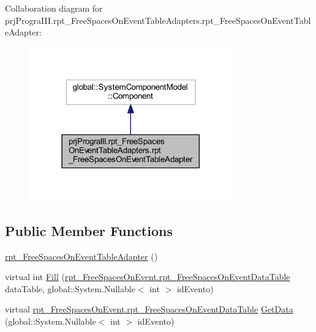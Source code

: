 Collaboration diagram for prj\+Progra\+I\+I\+I.\+rpt\+\_\+\+Free\+Spaces\+On\+Event\+Table\+Adapters.\+rpt\+\_\+\+Free\+Spaces\+On\+Event\+Table\+Adapter\+:
\nopagebreak
\begin{figure}[H]
\begin{center}
\leavevmode
\includegraphics[width=248pt]{classprj_progra_i_i_i_1_1rpt___free_spaces_on_event_table_adapters_1_1rpt___free_spaces_on_event_table_adapter__coll__graph}
\end{center}
\end{figure}
\subsection*{Public Member Functions}
\begin{DoxyCompactItemize}
\item 
\hyperlink{classprj_progra_i_i_i_1_1rpt___free_spaces_on_event_table_adapters_1_1rpt___free_spaces_on_event_table_adapter_a32a5f91416fc73ef5be530920866cb01}{rpt\+\_\+\+Free\+Spaces\+On\+Event\+Table\+Adapter} ()
\item 
virtual int \hyperlink{classprj_progra_i_i_i_1_1rpt___free_spaces_on_event_table_adapters_1_1rpt___free_spaces_on_event_table_adapter_a85a3f6077cbc8384ba689f8388099aae}{Fill} (\hyperlink{classprj_progra_i_i_i_1_1rpt___free_spaces_on_event_1_1rpt___free_spaces_on_event_data_table}{rpt\+\_\+\+Free\+Spaces\+On\+Event.\+rpt\+\_\+\+Free\+Spaces\+On\+Event\+Data\+Table} data\+Table, global\+::\+System.\+Nullable$<$ int $>$ id\+Evento)
\item 
virtual \hyperlink{classprj_progra_i_i_i_1_1rpt___free_spaces_on_event_1_1rpt___free_spaces_on_event_data_table}{rpt\+\_\+\+Free\+Spaces\+On\+Event.\+rpt\+\_\+\+Free\+Spaces\+On\+Event\+Data\+Table} \hyperlink{classprj_progra_i_i_i_1_1rpt___free_spaces_on_event_table_adapters_1_1rpt___free_spaces_on_event_table_adapter_a0c8cbd4e9ffa2968b4af23697451308a}{Get\+Data} (global\+::\+System.\+Nullable$<$ int $>$ id\+Evento)
\end{DoxyCompactItemize}
